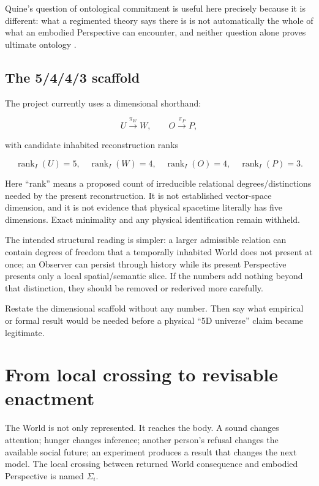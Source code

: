 \documentclass[11pt]{article}
\begin{document}
Quine's question of ontological commitment is useful here precisely because it is different: what a regimented theory says there is is not automatically the whole of what an embodied Perspective can encounter, and neither question alone proves ultimate ontology \cite{Quine1948WhatThereIs}.

\subsection{The 5/4/4/3 scaffold}

The project currently uses a dimensional shorthand:

\begin{equation}
U\xrightarrow{\pi_W}W,
\qquad O\xrightarrow{\pi_P}P,
\end{equation}

with candidate inhabited reconstruction ranks

\begin{equation}
\operatorname{rank}_I(U)=5,\quad
\operatorname{rank}_I(W)=4,\quad
\operatorname{rank}_I(O)=4,\quad
\operatorname{rank}_I(P)=3.
\end{equation}

Here ``rank'' means a proposed count of irreducible relational degrees/distinctions needed by the present reconstruction. It is not established vector-space dimension, and it is not evidence that physical spacetime literally has five dimensions. Exact minimality and any physical identification remain withheld.

The intended structural reading is simpler: a larger admissible relation can contain degrees of freedom that a temporally inhabited World does not present at once; an Observer can persist through history while its present Perspective presents only a local spatial/semantic slice. If the numbers add nothing beyond that distinction, they should be removed or rederived more carefully.

\begin{readercheck}
Restate the dimensional scaffold without any number. Then say what empirical or formal result would be needed before a physical ``5D universe'' claim became legitimate.
\end{readercheck}

\section{From local crossing to revisable enactment}

The World is not only represented. It reaches the body. A sound changes attention; hunger changes inference; another person's refusal changes the available social future; an experiment produces a result that changes the next model. The local crossing between returned World consequence and embodied Perspective is named $\Sigma_i$.
\end{document}
